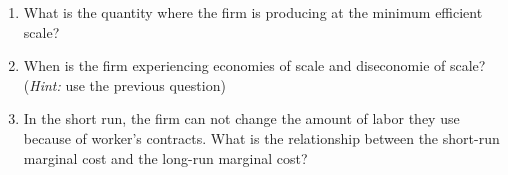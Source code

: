\documentclass[11pt]{article}
\newcommand{\answer}[1]{\iftoggle{INCLUDEANSWERS}{{\color{violet!70!white}\textbf{Solution:} #1}}{}}
\begin{document}
\begin{enumerate}
\begin{enumerate}
    \item What is the quantity where the firm is producing at the minimum efficient scale?
    
    \item When is the firm experiencing economies of scale and diseconomie of scale? (\emph{Hint:} use the previous question) 
    
    \item In the short run, the firm can not change the amount of labor they use because of worker's contracts. What is the relationship between the short-run marginal cost and the long-run marginal cost?
  \end{enumerate}

  \answer{
    \begin{enumerate}
      \item $MC(Q) = 2Q - 2$ and $ATC(Q) = TC(Q) / Q = Q - 2 + 10/Q$. 
      
      \item Minimum efficient scale is when $MC(Q^{MES}) = ATC(Q^{MES})$. This implies
      $$
        2Q - 2 = Q - 2 + 10/Q \implies Q = 10/Q \implies Q^2 = 10 \implies Q^{MES} = \sqrt{10}
      $$

      \item The firm is experiencing economies of scale when $Q < \sqrt{10}$ and diseconomies of scale when $Q > \sqrt{10}$. 
      
      \item In the short run, the firm's short-run marginal cost must be weakly greated than the long-run marginal cost.
    \end{enumerate}
  }
\end{enumerate}
\end{document}

